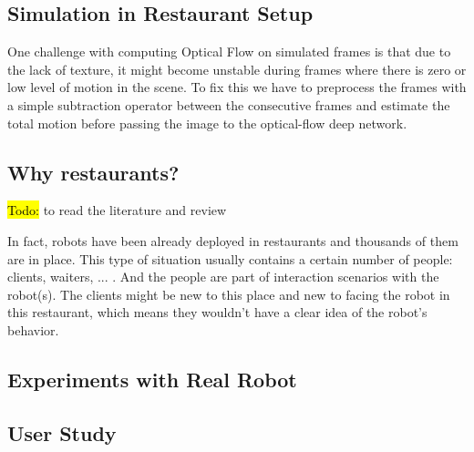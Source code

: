 \subsection{Simulation in Restaurant Setup}
One challenge with computing Optical Flow on simulated frames is that due to the lack of texture, it might become unstable during frames where there is zero or low level of motion in the scene. To fix this we have to preprocess the frames with a simple subtraction operator between the consecutive frames and estimate the total motion before passing the image to the optical-flow deep network.

\subsection{Why restaurants?}
\noindent
\hl{Todo:} to read the literature and review

In fact, robots have been already deployed in restaurants and thousands of them are in place. This type of situation usually contains a certain number of people: clients, waiters, ... . And the people are part of interaction scenarios with the robot(s). The clients might be new to this place and new to facing the robot in this restaurant, which means they wouldn't have a clear idea of the robot's behavior. 



\subsection{Experiments with Real Robot}



\subsection{User Study}